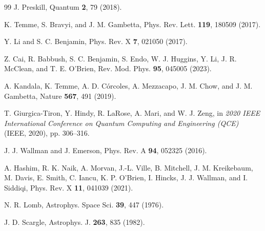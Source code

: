 \documentclass[10pt,twocolumn,a4paper]{article}
\begin{document}
\begin{thebibliography}{99}
\footnotesize
\setlength{\itemsep}{0pt}
\setlength{\parskip}{0pt}
J. Preskill, Quantum \textbf{2}, 79 (2018).

K. Temme, S. Bravyi, and J. M. Gambetta, Phys. Rev. Lett. \textbf{119}, 180509 (2017).

Y. Li and S. C. Benjamin, Phys. Rev. X \textbf{7}, 021050 (2017).

Z. Cai, R. Babbush, S. C. Benjamin, S. Endo, W. J. Huggins, Y. Li, J. R. McClean, and T. E. O'Brien, Rev. Mod. Phys. \textbf{95}, 045005 (2023).

A. Kandala, K. Temme, A. D. C{\'o}rcoles, A. Mezzacapo, J. M. Chow, and J. M. Gambetta, Nature \textbf{567}, 491 (2019).

T. Giurgica-Tiron, Y. Hindy, R. LaRose, A. Mari, and W. J. Zeng, in \textit{2020 IEEE International Conference on Quantum Computing and Engineering (QCE)} (IEEE, 2020), pp. 306--316.

J. J. Wallman and J. Emerson, Phys. Rev. A \textbf{94}, 052325 (2016).

A. Hashim, R. K. Naik, A. Morvan, J.-L. Ville, B. Mitchell, J. M. Kreikebaum, M. Davis, E. Smith, C. Iancu, K. P. O'Brien, I. Hincks, J. J. Wallman, and I. Siddiqi, Phys. Rev. X \textbf{11}, 041039 (2021).

N. R. Lomb, Astrophys. Space Sci. \textbf{39}, 447 (1976).

J. D. Scargle, Astrophys. J. \textbf{263}, 835 (1982).

\end{thebibliography}
\end{document}
